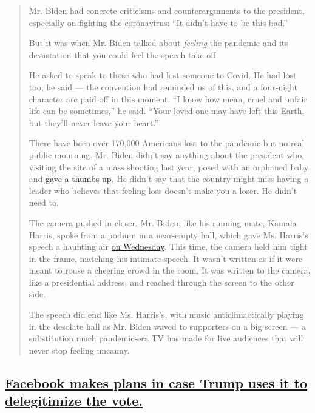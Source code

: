 \begin{quote}
Mr. Biden had concrete criticisms and counterarguments to the president,
especially on fighting the coronavirus: ``It didn't have to be this
bad.''

But it was when Mr. Biden talked about \emph{feeling} the pandemic and
its devastation that you could feel the speech take off.

He asked to speak to those who had lost someone to Covid. He had lost
too, he said --- the convention had reminded us of this, and a
four-night character arc paid off in this moment. ``I know how mean,
cruel and unfair life can be sometimes,'' he said. ``Your loved one may
have left this Earth, but they'll never leave your heart.''

There have been over 170,000 Americans lost to the pandemic but no real
public mourning. Mr. Biden didn't say anything about the president who,
visiting the site of a mass shooting last year, posed with an orphaned
baby and
\href{https://www.cnn.com/videos/politics/2019/08/09/donald-melania-trump-el-paso-orphaned-baby-photo-newday-sot.cnn}{gave
a thumbs up}. He didn't say that the country might miss having a leader
who believes that feeling loss doesn't make you a loser. He didn't need
to.

The camera pushed in closer. Mr. Biden, like his running mate, Kamala
Harris, spoke from a podium in a near-empty hall, which gave Ms.
Harris's speech a haunting air
\href{https://www.nytimes3xbfgragh.onion/2020/08/20/arts/television/dnc-barack-obama.html}{on
Wednesday}. This time, the camera held him tight in the frame, matching
his intimate speech. It wasn't written as if it were meant to rouse a
cheering crowd in the room. It was written to the camera, like a
presidential address, and reached through the screen to the other side.

The speech did end like Ms. Harris's, with music anticlimactically
playing in the desolate hall as Mr. Biden waved to supporters on a big
screen --- a substitution much pandemic-era TV has made for live
audiences that will never stop feeling uncanny.
\end{quote}

\hypertarget{facebook-makes-plans-in-case-trump-uses-it-to-delegitimize-the-vote}{%
\subsection{\texorpdfstring{\protect\hyperlink{facebook-makes-plans-in-case-trump-uses-it-to-delegitimize-the-vote}{Facebook
makes plans in case Trump uses it to delegitimize the
vote.}}{Facebook makes plans in case Trump uses it to delegitimize the vote.}}\label{facebook-makes-plans-in-case-trump-uses-it-to-delegitimize-the-vote}}

